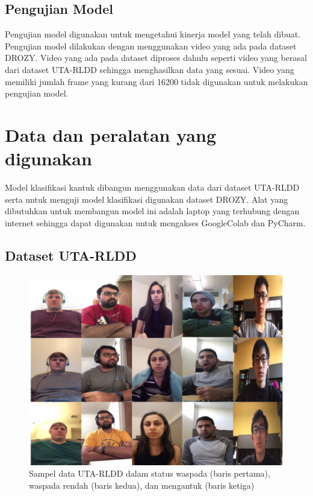 \subsection{Pengujian Model}
Pengujian model digunakan untuk mengetahui kinerja model yang telah dibuat. Pengujian model
dilakukan dengan menggunakan video yang ada pada dataset DROZY. Video yang ada pada dataset
diproses dahulu seperti video yang berasal dari dataset UTA-RLDD sehingga menghasilkan
data yang sesuai. Video yang memiliki jumlah frame yang kurang dari 16200 tidak digunakan
untuk melakukan pengujian model.

\section{Data dan peralatan yang digunakan}
Model klasifikasi kantuk dibangun menggunakan data dari dataset UTA-RLDD serta untuk
menguji model klasifikasi digunakan dataset DROZY. Alat yang dibutuhkan untuk membangun
model ini adalah laptop yang terhubung dengan internet sehingga dapat digunakan untuk mengakses
GoogleColab dan PyCharm.

\subsection{Dataset UTA-RLDD}

\begin{figure} [ht] \centering
      \includegraphics[scale=0.4]{gambar/utarldd.png}
      \caption{Sampel data UTA-RLDD dalam status waspada (baris pertama), waspada rendah (baris kedua), dan mengantuk (baris ketiga) \parencite{14}}
      \label{fig:utarldd}
\end{figure}

